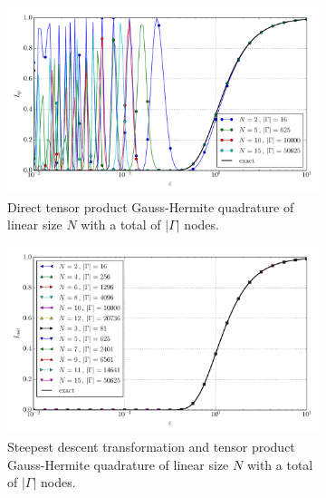 \documentclass[a4paper,10pt]{article}
\begin{document}
\begin{figure}[ht!]
  \begin{subfigure}[t]{0.5\linewidth}
    \includegraphics[width=\linewidth]{./plots/tp_4d_conv_eps_(0,0,0,0)_(0,0,0,0)_val_qr.pdf}
    \caption{Direct tensor product Gauss-Hermite quadrature of linear size $N$ with a total of $|\Gamma|$ nodes.}
    \label{fig:tp_4d_conv_eps_0000_0000_val_qr}
  \end{subfigure}
  \begin{subfigure}[t]{0.5\linewidth}
    \includegraphics[width=\linewidth]{./plots/tp_4d_conv_eps_(0,0,0,0)_(0,0,0,0)_val_nsd.pdf}
    \caption{Steepest descent transformation and tensor product Gauss-Hermite quadrature of linear size $N$ with a total of $|\Gamma|$ nodes.}
    \label{fig:tp_4d_conv_eps_0000_0000_val_nsd}
  \end{subfigure} \\
  \begin{subfigure}[t]{0.5\linewidth}

\end{subfigure}
\end{figure}
\end{document}
